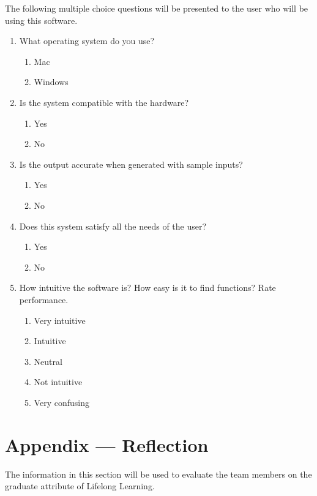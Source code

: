 \documentclass[12pt, titlepage]{article}
\begin{document}
The following multiple choice questions will be presented to the user who will be using this software.
\begin{enumerate}
  
\item What operating system do you use?
  \begin{enumerate}
    \item Mac
    \item Windows
  \end{enumerate}

\item Is the system compatible with the hardware?
  \begin{enumerate}
    \item Yes
    \item No
  \end{enumerate}

\item Is the output accurate when generated with sample inputs?
  \begin{enumerate}
    \item Yes
    \item No
  \end{enumerate}

\item Does this system satisfy all the needs of the user?
  \begin{enumerate}
    \item Yes
    \item No
  \end{enumerate}

\item How intuitive the software is? How easy is it to find functions? Rate performance.
  \begin{enumerate}
    \item Very intuitive
    \item Intuitive
    \item Neutral
    \item Not intuitive
    \item Very confusing
  \end{enumerate}

\end{enumerate}


\newpage{}
\section*{Appendix --- Reflection}

The information in this section will be used to evaluate the team members on the
graduate attribute of Lifelong Learning.
\end{document}
